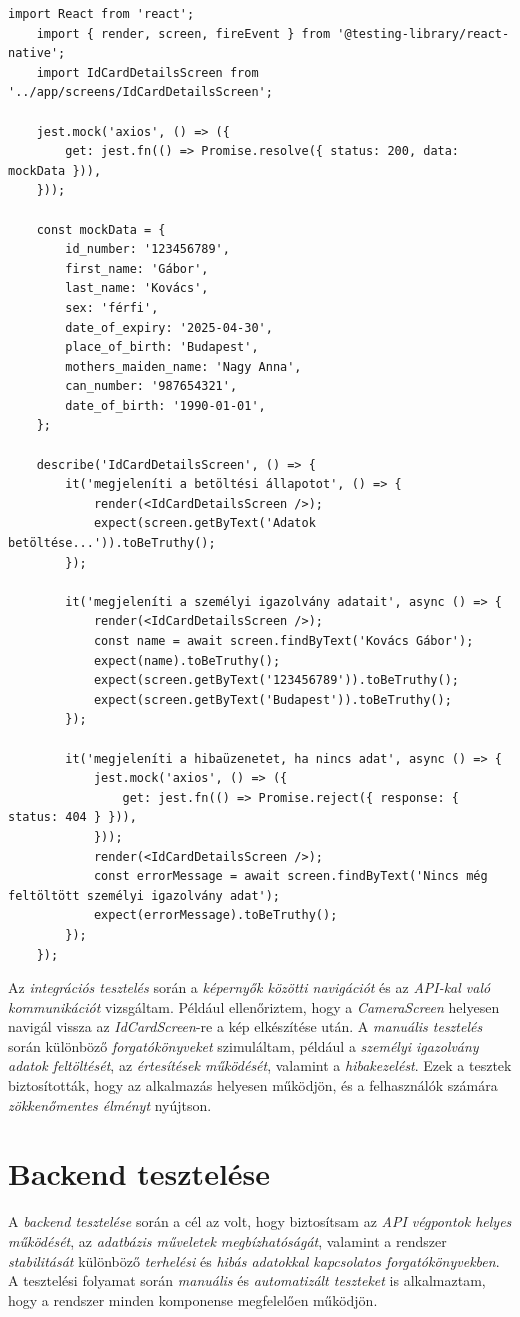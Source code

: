 \documentclass[
]{thesis-ekf}
\theoremstyle{definition}
\theoremstyle{remark}
\begin{document}
\begin{lstlisting}[style=myjavascript, caption={Funkció teszt}, label=kod-javascript1]
	import React from 'react';
	import { render, screen, fireEvent } from '@testing-library/react-native';
	import IdCardDetailsScreen from '../app/screens/IdCardDetailsScreen';
	
	jest.mock('axios', () => ({
		get: jest.fn(() => Promise.resolve({ status: 200, data: mockData })),
	}));
	
	const mockData = {
		id_number: '123456789',
		first_name: 'Gábor',
		last_name: 'Kovács',
		sex: 'férfi',
		date_of_expiry: '2025-04-30',
		place_of_birth: 'Budapest',
		mothers_maiden_name: 'Nagy Anna',
		can_number: '987654321',
		date_of_birth: '1990-01-01',
	};
	
	describe('IdCardDetailsScreen', () => {
		it('megjeleníti a betöltési állapotot', () => {
			render(<IdCardDetailsScreen />);
			expect(screen.getByText('Adatok betöltése...')).toBeTruthy();
		});
		
		it('megjeleníti a személyi igazolvány adatait', async () => {
			render(<IdCardDetailsScreen />);
			const name = await screen.findByText('Kovács Gábor');
			expect(name).toBeTruthy();
			expect(screen.getByText('123456789')).toBeTruthy();
			expect(screen.getByText('Budapest')).toBeTruthy();
		});
		
		it('megjeleníti a hibaüzenetet, ha nincs adat', async () => {
			jest.mock('axios', () => ({
				get: jest.fn(() => Promise.reject({ response: { status: 404 } })),
			}));
			render(<IdCardDetailsScreen />);
			const errorMessage = await screen.findByText('Nincs még feltöltött személyi igazolvány adat');
			expect(errorMessage).toBeTruthy();
		});
	});
\end{lstlisting}

Az \emph{integrációs tesztelés} során a \emph{képernyők közötti navigációt} és az \emph{API-kal való kommunikációt} vizsgáltam. Például ellenőriztem, hogy a \emph{CameraScreen} helyesen navigál vissza az \emph{IdCardScreen}-re a kép elkészítése után. A \emph{manuális tesztelés} során különböző \emph{forgatókönyveket} szimuláltam, például a \emph{személyi igazolvány adatok feltöltését}, az \emph{értesítések működését}, valamint a \emph{hibakezelést}. Ezek a tesztek biztosították, hogy az alkalmazás helyesen működjön, és a felhasználók számára \emph{zökkenőmentes élményt} nyújtson.

\section{Backend tesztelése} A \emph{backend tesztelése} során a cél az volt, hogy biztosítsam az \emph{API végpontok helyes működését}, az \emph{adatbázis műveletek megbízhatóságát}, valamint a rendszer \emph{stabilitását} különböző \emph{terhelési} és \emph{hibás adatokkal kapcsolatos forgatókönyvekben}. A tesztelési folyamat során \emph{manuális} és \emph{automatizált teszteket} is alkalmaztam, hogy a rendszer minden komponense megfelelően működjön.
\end{document}

